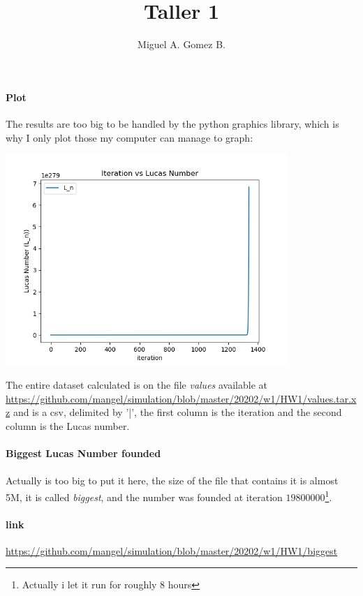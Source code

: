 \documentclass{article}
\title{Taller 1}
\author{Miguel A. Gomez B.}
\begin{document}
	\maketitle

\paragraph{Plot} The results are too big to be handled by the python graphics library, which is why I only plot those my computer can manage to graph:
\begin{center}
	\includegraphics[width=0.8\textwidth]{Plot}
\end{center}

The entire dataset calculated is on the file \textit{values} available at \url{https://github.com/mangel/simulation/blob/master/20202/w1/HW1/values.tar.xz} and is a csv, delimited by '|', the first column is the iteration and the second column is the Lucas number.

\paragraph{Biggest Lucas Number founded}
\paragraph{} Actually is too big to put it here, the size of the file that contains it is almost 5M, it is called \textit{biggest}, and the number was founded at iteration $19800000$\footnote{Actually i let it run for roughly 8 hours}.\\

\paragraph{link} \url{https://github.com/mangel/simulation/blob/master/20202/w1/HW1/biggest}
\end{document}
